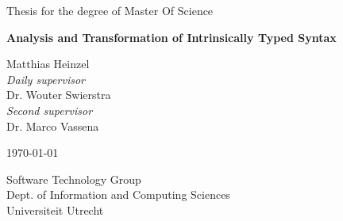 \begin{titlepage}
  \begin{center}
    \vspace*{1cm}

    \large
    Thesis for the degree of Master Of Science

    \vspace{0.4cm}

    \Huge \textbf{Analysis and Transformation of Intrinsically Typed Syntax}
    \date{\today}

    \vspace{1.6cm}

    \large
    Matthias Heinzel\\
    \vspace{0.8cm}
    \textit{Daily supervisor}\\
    Dr. Wouter Swierstra\\
    \vspace{0.4cm}
    \textit{Second supervisor}\\
    Dr. Marco Vassena\\

    \vfill

    \today

    \vspace{0.8cm}

    Software Technology Group\\
    Dept. of Information and Computing Sciences\\
    Universiteit Utrecht

  \end{center}
\end{titlepage}
